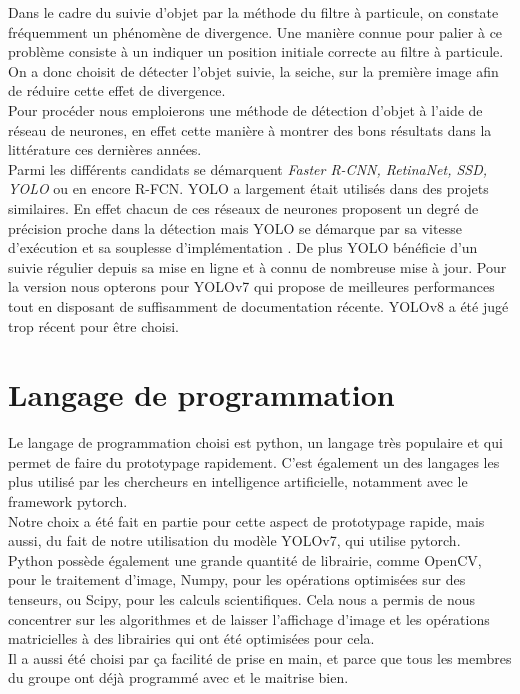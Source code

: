 Dans le cadre du suivie d'objet par la méthode du filtre à particule, on constate fréquemment un phénomène de divergence. Une manière connue pour palier à ce problème consiste à un indiquer un position initiale correcte au filtre à particule. On a donc choisit de détecter l'objet suivie, la seiche, sur la première image afin de réduire cette effet de divergence.\\
Pour procéder nous emploierons une méthode de détection d'objet à l'aide de réseau de neurones, en effet cette manière à montrer des bons résultats dans la littérature ces dernières années.\\
Parmi les différents candidats se démarquent \emph{Faster R-CNN\cite{ren_faster_2016}, RetinaNet\cite{lin_focal_2018}, SSD\cite{liu_ssd_2016}, YOLO\cite{redmon_you_2016}} ou en encore R-FCN\cite{dai_r-fcn_2016}. 
YOLO a largement était utilisés dans des projets similaires. En effet chacun de ces réseaux de neurones proposent un degré de précision proche dans la détection mais YOLO se démarque par sa vitesse d'exécution et sa souplesse d'implémentation \cite{sanchez_review_2020}. De plus YOLO bénéficie d'un suivie régulier depuis sa mise en ligne et à connu de nombreuse mise à jour. Pour la version nous opterons pour  YOLOv7\cite{wang_yolov7_nodate} qui propose de meilleures performances tout en disposant de suffisamment de documentation récente. YOLOv8 a été jugé trop récent pour être choisi.


\section{Langage de programmation}
Le langage de programmation choisi est python, un langage très populaire et qui permet de faire du prototypage rapidement. C'est également un des langages les plus utilisé par les chercheurs en intelligence artificielle, notamment avec le framework pytorch.\\
Notre choix a été fait en partie pour cette aspect de prototypage rapide, mais aussi, du fait de notre utilisation du modèle YOLOv7\cite{wang_yolov7_nodate}, qui utilise pytorch.\\
Python possède également une grande quantité de librairie, comme OpenCV, pour le traitement d'image, Numpy, pour les opérations optimisées sur des tenseurs, ou Scipy, pour les calculs scientifiques. Cela nous a permis de nous concentrer sur les algorithmes et de laisser l'affichage d'image et les opérations matricielles à des librairies qui ont été optimisées pour cela.\\
Il a aussi été choisi par ça facilité de prise en main, et parce que tous les membres du groupe ont déjà programmé avec et le maitrise bien.


\clearpage